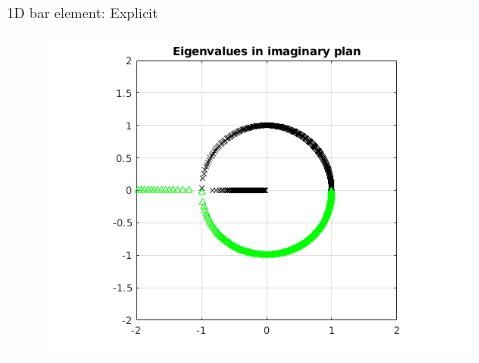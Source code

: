 \begin{frame}{1D bar element: Explicit}
\begin{figure}[ht] 
  \label{ fig7} 
  \begin{minipage}[b]{0.5\linewidth}
    \centering
    \includegraphics[scale=.35]{images/bar-exp-1.png} \\


\end{minipage}
\end{figure}
\end{frame}
